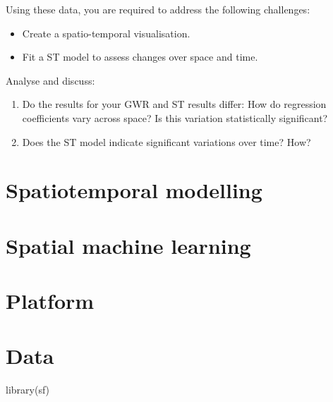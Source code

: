 \documentclass[
  letterpaper,
  krantz2]{style/krantz}
\newenvironment{Shaded}{\begin{snugshade}}{\end{snugshade}}
\newcommand{\FunctionTok}[1]{\textcolor[rgb]{0.28,0.35,0.67}{#1}}
\newcommand{\NormalTok}[1]{\textcolor[rgb]{0.00,0.23,0.31}{#1}}
\providecommand{\tightlist}{%
  \setlength{\itemsep}{0pt}\setlength{\parskip}{0pt}}\usepackage{longtable,booktabs,array}
\begin{document}
Using these data, you are required to address the following challenges:

\begin{itemize}
\item
  Create a spatio-temporal visualisation.
\item
  Fit a ST model to assess changes over space and time.
\end{itemize}

Analyse and discuss:

\begin{enumerate}
\def\labelenumi{\arabic{enumi}.}
\tightlist
\item
  Do the results for your GWR and ST results differ: How do regression
  coefficients vary across space? Is this variation statistically
  significant?
\item
  Does the ST model indicate significant variations over time? How?
\end{enumerate}

\hypertarget{spatiotemporal-modelling}{%
\chapter{Spatiotemporal modelling}\label{spatiotemporal-modelling}}

\hypertarget{spatial-machine-learning}{%
\chapter{Spatial machine learning}\label{spatial-machine-learning}}


\hypertarget{platform}{%
\chapter{Platform}\label{platform}}


\hypertarget{data-7}{%
\chapter{Data}\label{data-7}}

\begin{Shaded}
\begin{Highlighting}[]
\FunctionTok{library}\NormalTok{(sf)}
\end{Highlighting}
\end{Shaded}
\end{document}
